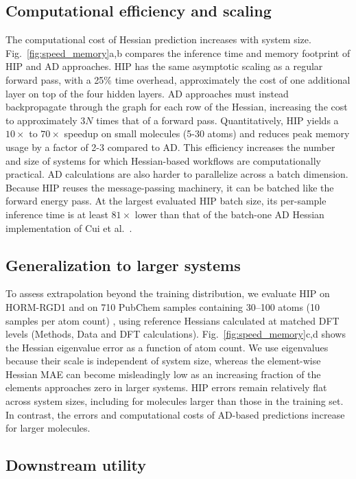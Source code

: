 \documentclass[pdflatex,sn-mathphys-num]{sn-jnl}%
\begin{document}
\subsection{Computational efficiency and scaling}
The computational cost of Hessian prediction increases with system size.
Fig.~\ref{fig:speed_memory}a,b compares the inference time and memory footprint of HIP and AD approaches.
HIP has the same asymptotic scaling as a regular forward pass, with a 25\% time overhead, approximately the cost of one additional layer on top of the four hidden layers.
AD approaches must instead backpropagate through the graph for each row of the Hessian, increasing the cost to approximately $3N$ times that of a forward pass.
Quantitatively, HIP yields a $10\times$ to $70\times$ speedup on small molecules (5-30 atoms) and reduces peak memory usage by a factor of 2-3 compared to AD.
This efficiency increases the number and size of systems for which Hessian-based workflows are computationally practical.
AD calculations are also harder to parallelize across a batch dimension.
Because HIP reuses the message-passing machinery, it can be batched like the forward energy pass. At the largest evaluated HIP batch size, its per-sample inference time is at least $81\times$ lower than that of the batch-one AD Hessian implementation of Cui et al.~\citep{cui2025horm}.

\subsection{Generalization to larger systems}
To assess extrapolation beyond the training distribution, we evaluate HIP on HORM-RGD1 and on 710 PubChem samples containing 30--100 atoms (10 samples per atom count) \citep{kim2025pubchem}, using reference Hessians calculated at matched DFT levels (Methods, Data and DFT calculations). Fig.~\ref{fig:speed_memory}c,d shows the Hessian eigenvalue error as a function of atom count. We use eigenvalues because their scale is independent of system size, whereas the element-wise Hessian MAE can become misleadingly low as an increasing fraction of the elements approaches zero in larger systems.
HIP errors remain relatively flat across system sizes, including for molecules larger than those in the training set.
In contrast, the errors and computational costs of AD-based predictions increase for larger molecules.


\subsection{Downstream utility}
\end{document}
